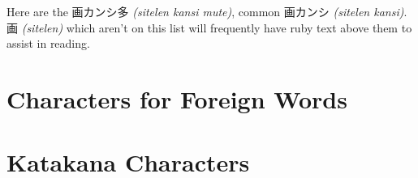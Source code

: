 \documentclass{ctexart}
\begin{document}
Here are the 画カンシ多 {\it{}(sitelen kansi mute)},
common 画カンシ {\it{}(sitelen kansi)}.
画 {\it{}(sitelen)} which aren't on this list will frequently have ruby text above them to assist in reading.\\

{
\Huge
{}






}

\newpage
\section[画ぴ名无 – sitelen pi nimi weka]{
  \Huge\englishundertokisin
    {}
    {\small\normalfont{}Characters for Foreign Words}
}



\section[画片仮名 – Sitelen Katakana]{
  \Huge\englishundertokisin
    {}
    {\small\normalfont{}Katakana Characters}
}
\end{document}
